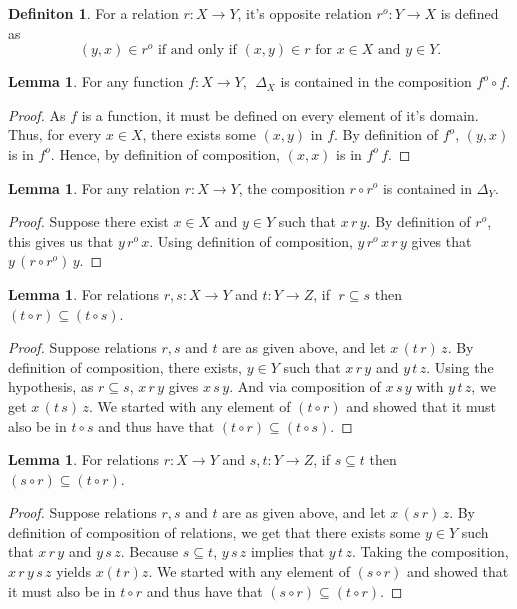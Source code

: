 \documentclass[18pt,a4paper]{article}
\theoremstyle{definition}
\newtheorem{definition}[theorem]{Definiton}
\newtheorem{lemma}[theorem]{Lemma}
\begin{document}
		\begin{definition} %
			For a relation $r:X \to Y$, it's opposite relation $r^o:Y \to X$ is defined as
			\[ (y,x) \in r^o \text{ if and only if } (x,y)\in r  \text{ for } x\in X \text{ and }
			y \in Y.\]
		\end{definition}
		\begin{lemma}
			For any function $f:X \to Y$, $\; \Delta_X$ is contained in the composition $ f^o \circ f$.
		\end{lemma}
		\begin{proof}\setcounter{equation}{0}

			As $f$ is a function, it must be defined on every element of it's domain. Thus, for every
			$x \in X$, there exists some $(x,y)$ in $f$. By definition of $f^o$, $(y,x)$ is in $f^o$.
			Hence, by definition of composition, $(x,x)$ is in $f^o \,f$.
		\end{proof}
		\begin{lemma}
			For any relation $r:X \to Y$, the composition $r\circ r^o$ is contained in $\Delta_Y$.
		\end{lemma}
		\begin{proof}\setcounter{equation}{0}

			Suppose there exist $x \in X$ and $y \in Y$ such that
			$x\,r\,y$. By definition of $r^o$, this
			gives us that $y\, r^o \,x$. Using definition of composition,
			$y\, r^o \,x \,r\,y$ gives that	$y\, (r \circ r^o)\, y$.
		\end{proof}
		\begin{lemma} For relations $r,s:X\to Y$ and $t:Y\to Z$, if $\;r \subseteq s$ then $(t \circ r) \subseteq (t \circ s)$.
		\end{lemma}
		\begin{proof}\setcounter{equation}{0}

			Suppose relations $r,s$ and $t$ are as given above, and let $x \,(t \, r)\,z$.
			By definition of composition, there
			exists, $y \in Y$ such that $x\,r\,y$ and $y\,t\,z$.
			Using the hypothesis, as $r \subseteq  s $,
			$x\,r\,y$ gives $x\,s\,y$. And via composition of $x\,s\,y$ with $y \, t \, z $, we get
			$x\,(t\,s)\, z$. We started with any element of $(t \circ r)$ and showed that
			it must also be in $t \circ s$ and thus have that $(t \circ r) \subseteq (t \circ s)$.
		\end{proof}
		\begin{lemma} For relations $r:X\to Y$ and $s,t:Y\to Z$, if $s\subseteq t$ then
			$(s \circ r) \subseteq (t \circ r)$.
		\end{lemma}
		\begin{proof}\setcounter{equation}{0}

			Suppose relations $r,s$ and $t$ are as given above, and let  $x \,(s \, r)\,z$.
			By definition of composition of relations, we get that there exists
			some $y \in Y$ such that $x\,r\,y$ and $y\,s\,z$. Because $s \subseteq t$, $y\,s\,z$
			implies that $y\,t\,z$. Taking the composition, $x\,r\,y\,s\,z$ yields $x(t\,r)z$.
			We started with any element of $(s \circ r)$ and showed that it must also be in
			$t \circ r$ and thus have that $(s \circ r) \subseteq (t \circ r)$.
		\end{proof}
\end{document}
